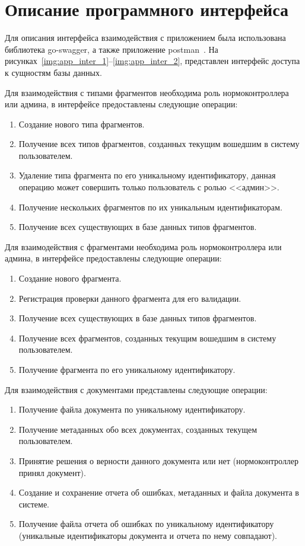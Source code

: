 \section{Описание программного интерфейса}
Для описания интерфейса взаимодействия с приложением была использована библиотека go-swagger, а также приложение postman~\cite{go-swagger,postman}. На рисунках~\ref{img:app_inter_1}--\ref{img:app_inter_2}, представлен интерфейс доступа к сущностям базы данных.

Для взаимодействия с типами фрагментов необходима роль нормоконтроллера или админа, в интерфейсе предоставлены следующие операции:
\begin{enumerate}
	\item Создание нового типа фрагментов.
	\item Получение всех типов фрагментов, созданных текущим вошедшим в систему пользователем.
	\item Удаление типа фрагмента по его уникальному идентификатору, данная операцию может совершить только пользователь с ролью <<админ>>.
	\item Получение нескольких фрагментов по их уникальным идентификаторам.
	\item Получение всех существующих в базе данных типов фрагментов.
\end{enumerate}

Для взаимодействия с фрагментами необходима роль нормоконтроллера или админа, в интерфейсе предоставлены следующие операции:
\begin{enumerate}
	\item Создание нового фрагмента.
	\item Регистрация проверки данного фрагмента для его валидации.
	\item Получение всех существующих в базе данных типов фрагментов.
	\item Получение всех фрагментов, созданных текущим вошедшим в систему пользователем.
	\item Получение фрагмента по его уникальному идентификатору.
\end{enumerate}

Для взаимодействия с документами представлены следующие операции:
\begin{enumerate}
	\item Получение файла документа по уникальному идентификатору.
	\item Получение метаданных обо всех документах, созданных текущем пользователем.
	\item Принятие решения о верности данного документа или нет (нормоконтроллер принял документ).
	\item Создание и сохранение отчета об ошибках, метаданных и файла документа в системе.
	\item Получение файла отчета об ошибках по уникальному идентификатору (уникальные идентификаторы документа и отчета по нему совпадают).
\end{enumerate}

